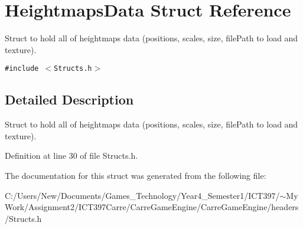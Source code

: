 \hypertarget{struct_heightmaps_data}{
\section{HeightmapsData Struct Reference}
\label{struct_heightmaps_data}
}
Struct to hold all of heightmaps data (positions, scales, size, filePath to load and texture).  


{\tt \#include $<$Structs.h$>$}



\subsection{Detailed Description}
Struct to hold all of heightmaps data (positions, scales, size, filePath to load and texture). 

Definition at line 30 of file Structs.h.

The documentation for this struct was generated from the following file:\begin{CompactItemize}
\item 
C:/Users/New/Documents/Games\_\-Technology/Year4\_\-Semester1/ICT397/$\sim$My Work/Assignment2/ICT397Carre/CarreGameEngine/CarreGameEngine/headers/Structs.h\end{CompactItemize}

